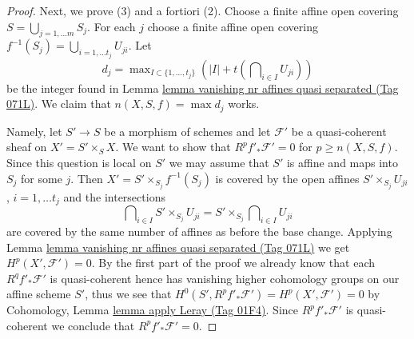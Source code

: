 \documentclass{amsart}
\theoremstyle{plain}
\theoremstyle{definition}
\theoremstyle{remark}
\numberwithin{equation}{subsection}
\begin{document}
\begin{proof}
\medskip\noindent
Next, we prove (3) and a fortiori (2). Choose a finite affine open
covering $S = \bigcup_{j = 1, \ldots m} S_j$. For each $j$ choose
a finite affine open covering
$f^{-1}(S_j) = \bigcup_{i = 1, \ldots t_j} U_{ji} $.
Let
$$
d_j = \max\nolimits_{I \subset \{1, \ldots, t_j\}}
\left(|I| + t(\bigcap\nolimits_{i \in I} U_{ji})\right)
$$
be the integer found in
Lemma \href{https://stacks.math.columbia.edu/tag/071L}{lemma vanishing nr affines quasi separated (Tag 071L)}.
We claim that $n(X, S, f) = \max d_j$ works.

\medskip\noindent
Namely, let $S' \to S$ be a morphism of schemes and let
$\mathcal{F}'$ be a quasi-coherent sheaf on $X' = S' \times_S X$.
We want to show that $R^pf'_*\mathcal{F}' = 0$ for $p \geq n(X, S, f)$.
Since this question is local on $S'$ we may assume that $S'$ is affine
and maps into $S_j$ for some $j$. Then $X' = S' \times_{S_j} f^{-1}(S_j)$
is covered by the open affines $S' \times_{S_j} U_{ji}$, $i = 1, \ldots t_j$
and the intersections
$$
\bigcap\nolimits_{i \in I} S' \times_{S_j} U_{ji} =
S' \times_{S_j} \bigcap\nolimits_{i \in I} U_{ji}
$$
are covered by the same number of affines as before the base change.
Applying
Lemma \href{https://stacks.math.columbia.edu/tag/071L}{lemma vanishing nr affines quasi separated (Tag 071L)}
we get $H^p(X', \mathcal{F}') = 0$. By the first part of the proof
we already know that each $R^qf'_*\mathcal{F}'$ is quasi-coherent
hence has vanishing higher cohomology groups on our affine scheme $S'$,
thus we see that $H^0(S', R^pf'_*\mathcal{F}') = H^p(X', \mathcal{F}') = 0$
by Cohomology, Lemma \href{https://stacks.math.columbia.edu/tag/01F4}{lemma apply Leray (Tag 01F4)}.
Since $R^pf'_*\mathcal{F}'$ is quasi-coherent
we conclude that $R^pf'_*\mathcal{F}' = 0$.
\end{proof}
\end{document}
